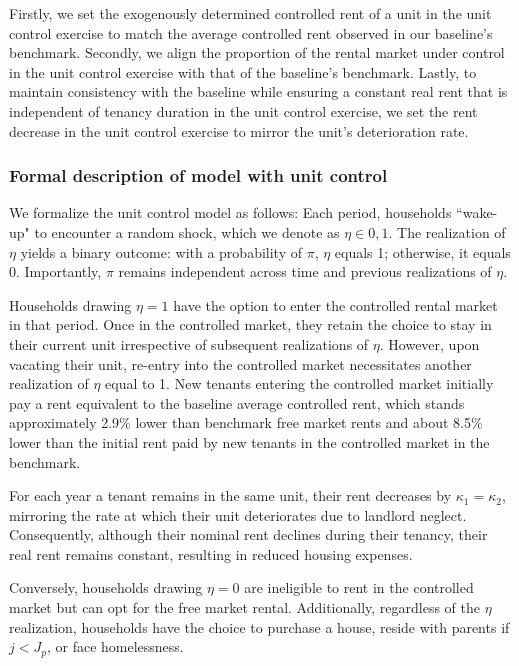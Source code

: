 \documentclass[parskip=full]{article}
\begin{document}
Firstly, we set the exogenously determined controlled rent of a unit in the unit control exercise to match the average controlled rent observed in our baseline's benchmark. Secondly, we align the proportion of the rental market under control in the unit control exercise with that of the baseline's benchmark. Lastly, to maintain consistency with the baseline while ensuring a constant real rent that is independent of tenancy duration in the unit control exercise, we set the rent decrease in the unit control exercise to mirror the unit's deterioration rate.

\subsubsection{Formal description of model with unit control}

We formalize the unit control model as follows: Each period, households ``wake-up" to encounter a random shock, which we denote as $\eta \in {0,1}$. The realization of $\eta$ yields a binary outcome: with a probability of $\pi$, $\eta$ equals 1; otherwise, it equals 0. Importantly, $\pi$ remains independent across time and previous realizations of $\eta$.

Households drawing $\eta = 1$ have the option to enter the controlled rental market in that period. Once in the controlled market, they retain the choice to stay in their current unit irrespective of subsequent realizations of $\eta$. However, upon vacating their unit, re-entry into the controlled market necessitates another realization of $\eta$ equal to 1. New tenants entering the controlled market initially pay a rent equivalent to the baseline average controlled rent, which stands approximately 2.9\% lower than benchmark free market rents and about 8.5\% lower than the initial rent paid by new tenants in the controlled market in the benchmark.

For each year a tenant remains in the same unit, their rent decreases by $\kappa_{1}=\kappa_{2}$, mirroring the rate at which their unit deteriorates due to landlord neglect. Consequently, although their nominal rent declines during their tenancy, their real rent remains constant, resulting in reduced housing expenses.

Conversely, households drawing $\eta = 0$ are ineligible to rent in the controlled market but can opt for the free market rental. Additionally, regardless of the $\eta$ realization, households have the choice to purchase a house, reside with parents if $j<J_{p}$, or face homelessness.
\end{document}
